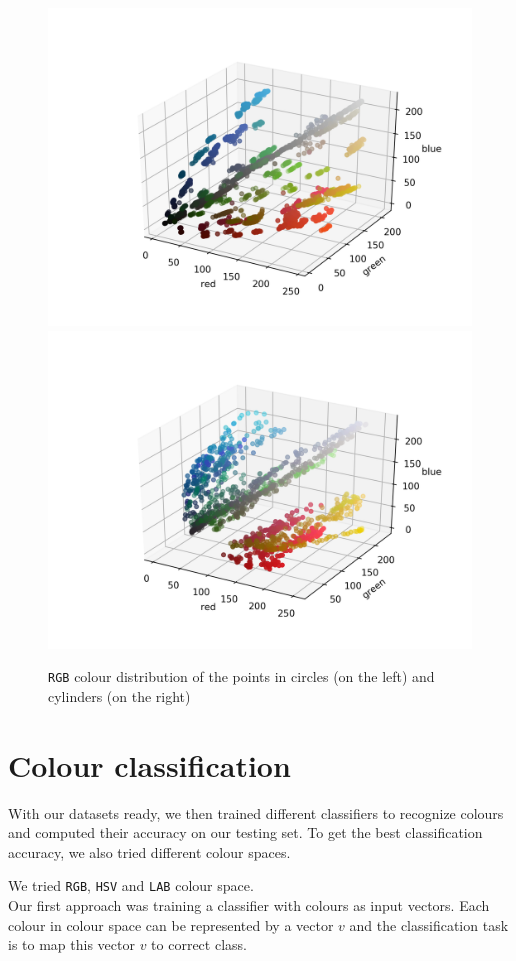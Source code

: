 \documentclass[12pt,a4paper]{article}
\begin{document}
	\begin{figure}[H]
		\centering
		\includegraphics[width=.45\linewidth]{images/rgb.png}
		\includegraphics[width=.45\linewidth]{images/test_rgb.png}
		\caption{\texttt{RGB} colour distribution of the points in circles (on the left) and cylinders (on the right)}
	\end{figure}

	
	\section{Colour classification}

	With our datasets ready, we then trained different classifiers to recognize colours and computed their accuracy on our testing set. To get the best classification accuracy, we also tried different colour spaces. 

	We tried \texttt{RGB}, \texttt{HSV} and \texttt{LAB} colour space.\\

	Our first approach was training a classifier with colours as input vectors. Each colour in colour space can be represented by a vector $v$ and the classification task is to map this vector $v$ to correct class. \\
	
\end{document}
